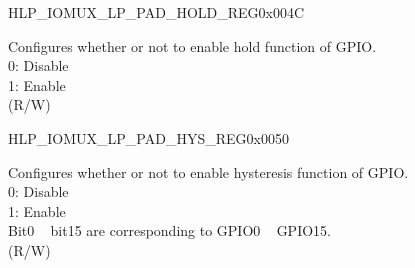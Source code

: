 \begin{register}{H}{LP\_IOMUX\_LP\_PAD\_HOLD\_REG}{0x004C}\label{regdesc:LPIOMUXLPPADHOLDREG}
%
%
\regnewline%
\begin{regdesc}\begin{reglist}
\label{fielddesc:LPIOMUXLPGPIOHOLD}\item [LP\_IOMUX\_LP\_GPIO\_HOLD] Configures whether or not to enable hold function of GPIO.\\
0: Disable\\
1: Enable\\
(R/W)
\end{reglist}\end{regdesc}
\end{register}


\begin{register}{H}{LP\_IOMUX\_LP\_PAD\_HYS\_REG}{0x0050}\label{regdesc:LPIOMUXLPPADHYSREG}
%
%
\regnewline%
\begin{regdesc}\begin{reglist}
\label{fielddesc:LPIOMUXLPGPIOHYS}\item [LP\_IOMUX\_LP\_GPIO\_HYS] Configures whether or not to enable hysteresis function of GPIO.\\
0: Disable\\
1: Enable\\
Bit0 ~ bit15 are corresponding to GPIO0 ~ GPIO15.\\
(R/W)
\end{reglist}\end{regdesc}
\end{register}


